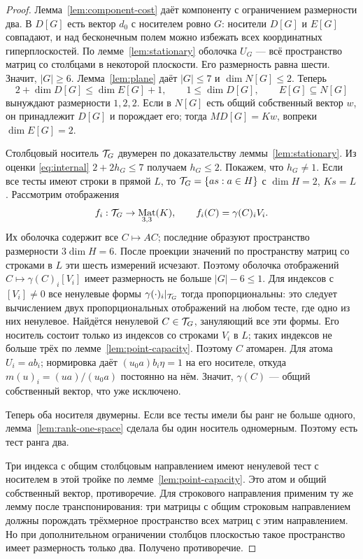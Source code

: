 \documentclass[11pt,a4paper]{article}
\numberwithin{equation}{section}
\theoremstyle{plain}
\theoremstyle{definition}
\DeclareMathOperator{\Mat}{Mat}\DeclareMathOperator{\Span}{span}
\newcommand{\leqs}{\leqslant}\newcommand{\geqs}{\geqslant}
\begin{document}
\begin{proof}
Лемма~\ref{lem:component-cost} даёт компоненту с ограничением размерности два.
В $D[G]$ есть вектор $d_0$ с носителем ровно $G$: носители $D[G]$ и
$E[G]$ совпадают, и над бесконечным полем можно избежать всех
координатных гиперплоскостей. По лемме~\ref{lem:stationary}
оболочка $U_G$ --- всё пространство матриц со столбцами в некоторой
плоскости. Его размерность равна шести.
Значит, $|G|\geqs6$. Лемма~\ref{lem:plane} даёт $|G|\leqs7$ и
$\dim N[G]\leqs2$. Теперь
\[
 2+\dim D[G]\leqs\dim E[G]+1,\qquad
 1\leqs\dim D[G],\qquad E[G]\subseteq N[G]
\]
вынуждают размерности $1,2,2$. Если в $N[G]$ есть общий собственный
вектор $w$, он принадлежит $D[G]$ и порождает его; тогда $MD[G]=Kw$,
вопреки $\dim E[G]=2$.

Столбцовый носитель $\mathcal T_G$ двумерен по доказательству
леммы~\ref{lem:stationary}. Из оценки \eqref{eq:internal}
$2+2h_G\leqs7$ получаем $h_G\leqs2$.
Покажем, что $h_G\ne1$. Если все тесты имеют строки в прямой $L$,
то $\mathcal T_G=\{as:a\in H\}$ с $\dim H=2$, $Ks=L$.
Рассмотрим отображения
\[
 f_i:\test_G\to\Mat_{3,3}(K),\qquad f_i(C)=\gamma(C)_iV_i.
\]
Их оболочка содержит все $C\mapsto AC$; последние образуют пространство
размерности $3\dim H=6$. После проекции значений по пространству
матриц со строками в $L$ эти шесть измерений исчезают. Поэтому оболочка
отображений $C\mapsto\gamma(C)_i[V_i]$ имеет размерность не больше
$|G|-6\leqs1$.
Для индексов с $[V_i]\ne0$ все ненулевые формы
$\gamma(\cdot)_i|_{\mathcal T_G}$ тогда пропорциональны: это следует
вычислением двух пропорциональных отображений на любом тесте, где
одно из них ненулевое. Найдётся ненулевой $C\in\mathcal T_G$, зануляющий
все эти формы. Его носитель состоит только из индексов со строками
$V_i$ в $L$; таких индексов не больше трёх по
лемме~\ref{lem:point-capacity}. Поэтому $C$ атомарен.
Для атома $U_i=ab_i$; нормировка даёт
$(u_0a)b_i\eta=1$ на его носителе, откуда
$m(u)_i=(ua)/(u_0a)$ постоянно на нём. Значит, $\gamma(C)$ ---
общий собственный вектор, что уже исключено.

Теперь оба носителя двумерны. Если все тесты имели бы ранг не больше
одного, лемма~\ref{lem:rank-one-space} сделала бы один носитель
одномерным. Поэтому есть тест ранга два.

Три индекса с общим столбцовым направлением имеют ненулевой тест
с носителем в этой тройке по
лемме~\ref{lem:point-capacity}. Это атом и общий собственный вектор,
противоречие. Для строкового направления применим ту же лемму после
транспонирования: три матрицы с общим строковым направлением
должны порождать трёхмерное пространство всех матриц с этим
направлением. Но при дополнительном ограничении столбцов плоскостью
такое пространство имеет размерность только два. Получено противоречие.
\end{proof}
\end{document}
